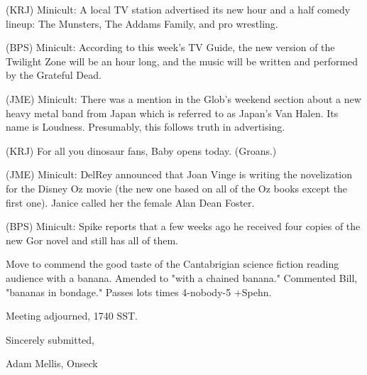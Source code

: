 \documentclass[12pt]{article}
\begin{document}
(KRJ) Minicult: A local TV station advertised its new hour and a half comedy lineup: The Munsters, The Addams Family, and pro wrestling.

(BPS) Minicult: According to this week's TV Guide, the new version of the Twilight Zone will be an hour long, and the music will be written and performed by the Grateful Dead.

(JME) Minicult: There was a mention in the Glob's weekend section about a new heavy metal band from Japan which is referred to as Japan's Van Halen. Its name is Loudness. Presumably, this follows truth in advertising.

(KRJ) For all you dinosaur fans, Baby opens today. (Groans.)

(JME) Minicult: DelRey announced that Joan Vinge is writing the novelization for the Disney Oz movie (the new one based on all of the Oz books except the first one). Janice called her the female Alan Dean Foster.

(BPS) Minicult: Spike reports that a few weeks ago he received four copies of the new Gor novel and still has all of them.

Move to commend the good taste of the Cantabrigian science fiction reading audience with a banana. Amended to "with a chained banana." Commented Bill, "bananas in bondage." Passes lots times 4-nobody-5 +Spehn.

\vspace{12pt}

\noindent
Meeting adjourned, 1740 SST.

\vspace{18pt}

\centerline{Sincerely submitted,}
\centerline{Adam Mellis, Onseck}
\end{document}
